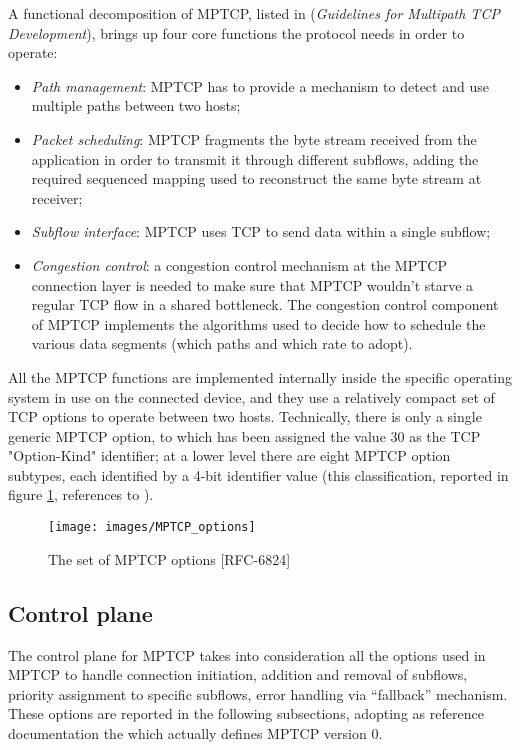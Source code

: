 A functional decomposition of MPTCP, listed in  (\textit{Guidelines for Multipath TCP Development}), brings up four core functions the protocol needs in order to operate:
\begin{itemize}
  \item \textit{Path management}: MPTCP has to provide a mechanism to detect and use multiple paths between two hosts;
  \item \textit{Packet scheduling}: MPTCP fragments the byte stream received from the application in order to transmit it through different subflows, adding the required sequenced mapping used to reconstruct the same byte stream at receiver;
  \item \textit{Subflow interface}: MPTCP uses TCP to send data within a single subflow;
  \item \textit{Congestion control}: a congestion control mechanism at the MPTCP connection layer is needed to make sure that MPTCP wouldn't starve a regular TCP flow in a shared bottleneck. The congestion control component of MPTCP implements the algorithms used to decide how to schedule the various data segments (which paths and which rate to adopt).
  \end{itemize}

All the MPTCP functions are implemented internally inside the specific operating system in use on the connected device, and they use a relatively compact set of TCP options to operate between two hosts. Technically, there is only a single generic MPTCP option, to which has been assigned the value 30 as the TCP "Option-Kind" identifier; at a lower level there are eight MPTCP option subtypes, each identified by a 4-bit identifier value (this classification, reported in figure \ref{fig:MPTCP_options}, references to ). 

\begin{figure}[!htb]
\centering
\texttt{[image: images/MPTCP\_options]}
\caption{The set of MPTCP options [RFC-6824]}
\label{fig:MPTCP_options}
\end{figure}

\subsection{Control plane}
The control plane for MPTCP takes into consideration all the options used in MPTCP to handle connection initiation, addition and removal of subflows, priority assignment to specific subflows, error handling via ``fallback'' mechanism. These options are reported in the following subsections, adopting as reference documentation the  which actually defines MPTCP version 0.

